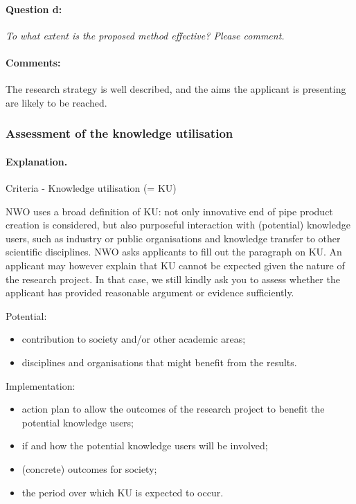 \documentclass[serif, twocolumn, numeric, rga]{jote-article}
\begin{document}
\paragraph{Question d:}
\textit{To what extent is the proposed method effective? Please comment.}

\paragraph{Comments:}

The research strategy is well described, and the aims the applicant is presenting are likely to be reached.

 {}\subsubsection*{Assessment of the knowledge utilisation} 

\paragraph{Explanation.}

Criteria - Knowledge utilisation (= KU) 

NWO uses a broad definition of KU: not only innovative end of pipe product creation is considered, but also purposeful interaction with (potential) knowledge users, such as industry or public organisations and knowledge transfer to other scientific disciplines. NWO asks applicants to fill out the paragraph on KU. An applicant may however explain that KU cannot be expected given the nature of the research project. In that case, we still kindly ask you to assess whether the applicant has provided reasonable argument or evidence sufficiently. 

\noindent Potential: \begin{itemize} \item contribution to society and/or other academic areas; \item disciplines and organisations that might benefit from the results. \end{itemize}
Implementation: \begin{itemize} \item action plan to allow the outcomes of the research project to benefit the potential knowledge users; \item if and how the potential knowledge users will be involved; \item (concrete) outcomes for society; \item the period over which KU is expected to occur.\end{itemize}
\end{document}
